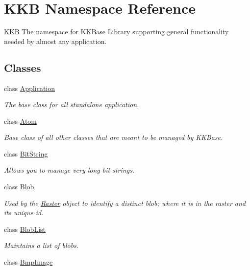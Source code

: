 \hypertarget{namespace_k_k_b}{}\section{K\+KB Namespace Reference}
\label{namespace_k_k_b}


\hyperlink{namespace_k_k_b}{K\+KB} The namespace for K\+K\+Base Library supporting general functionality needed by almost any application.  


\subsection*{Classes}
\begin{DoxyCompactItemize}
\item 
class \hyperlink{class_k_k_b_1_1_application}{Application}
\begin{DoxyCompactList}\small\item\em The base class for all standalone application. \end{DoxyCompactList}\item 
class \hyperlink{class_k_k_b_1_1_atom}{Atom}
\begin{DoxyCompactList}\small\item\em Base class of all other classes that are meant to be managed by \textquotesingle{}K\+K\+Base\textquotesingle{}. \end{DoxyCompactList}\item 
class \hyperlink{class_k_k_b_1_1_bit_string}{Bit\+String}
\begin{DoxyCompactList}\small\item\em Allows you to manage very long bit strings. \end{DoxyCompactList}\item 
class \hyperlink{class_k_k_b_1_1_blob}{Blob}
\begin{DoxyCompactList}\small\item\em Used by the \hyperlink{class_k_k_b_1_1_raster}{Raster} object to identify a distinct blob; where it is in the raster and its unique id. \end{DoxyCompactList}\item 
class \hyperlink{class_k_k_b_1_1_blob_list}{Blob\+List}
\begin{DoxyCompactList}\small\item\em Maintains a list of blobs. \end{DoxyCompactList}\item 
class \hyperlink{class_k_k_b_1_1_bmp_image}{Bmp\+Image}

\end{DoxyCompactItemize}
